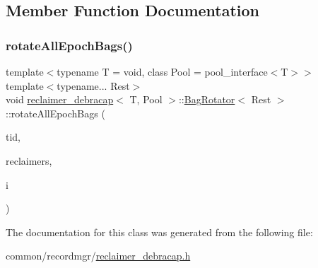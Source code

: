 \subsection{Member Function Documentation}
\mbox{\label{classreclaimer__debracap_1_1BagRotator_a2755f52fdc6120af1af61ac4577df2ee}} 
\subsubsection{\texorpdfstring{rotate\+All\+Epoch\+Bags()}{rotateAllEpochBags()}}
{\footnotesize\ttfamily template$<$typename T  = void, class Pool  = pool\+\_\+interface$<$\+T$>$$>$ \\
template$<$typename... Rest$>$ \\
void \hyperlink{classreclaimer__debracap}{reclaimer\+\_\+debracap}$<$ T, Pool $>$\+::\hyperlink{classreclaimer__debracap_1_1BagRotator}{Bag\+Rotator}$<$ Rest $>$\+::rotate\+All\+Epoch\+Bags (\begin{DoxyParamCaption}\item[{const int}]{tid,  }\item[{void $\ast$const $\ast$const}]{reclaimers,  }\item[{const int}]{i }\end{DoxyParamCaption})\hspace{0.3cm}{\ttfamily [inline]}}



The documentation for this class was generated from the following file\+:\begin{DoxyCompactItemize}
\item 
common/recordmgr/\hyperlink{reclaimer__debracap_8h}{reclaimer\+\_\+debracap.\+h}\end{DoxyCompactItemize}
